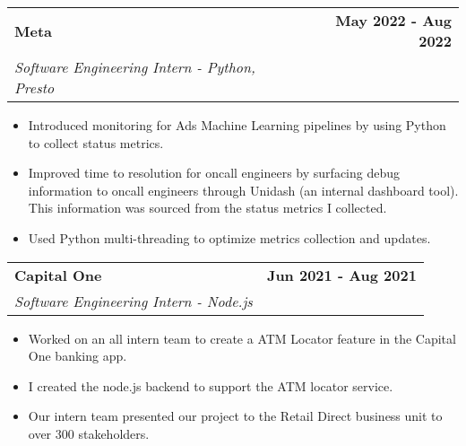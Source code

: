 \documentclass[10pt]{extreport}
\makeatletter
\newcommand{\resumeSubheading}[4]{
  \vspace{-1pt}
    \begin{tabular*}{1.0\textwidth}{l@{\extracolsep{\fill}}r}
      \textbf{#1} & \textbf{#2}  \vspace{1mm} \\
      {#3} & \textbf{#4} \\
    \end{tabular*}\vspace{-3pt}
}
\makeatother
\begin{document}
\resumeSubheading{Meta}{May 2022 - Aug 2022}
    {\textit{Software Engineering Intern - Python, Presto}}{}
    \vspace{-2mm}
    \begin{itemize}
     \item[\textperiodcentered] Introduced monitoring for Ads Machine Learning pipelines by using Python to collect status metrics.

     \vspace{-2mm}
     \item[\textperiodcentered] Improved time to resolution for oncall engineers by surfacing debug information to oncall engineers through Unidash (an internal dashboard tool). This information was sourced from the status metrics I collected.

     \vspace{-2mm}
     \item[\textperiodcentered] Used Python multi-threading to optimize metrics collection and updates.
    \end{itemize}
    
    \resumeSubheading{Capital One}{Jun 2021 - Aug 2021}
    {\textit{Software Engineering Intern - Node.js}}{}
    \vspace{-2mm}
    \begin{itemize}
    \item[\textperiodcentered] Worked on an all intern team to create a ATM Locator feature in the Capital One banking app.
            \vspace{-2mm}

        \item[\textperiodcentered] I created the node.js backend to support the ATM locator service.
                \vspace{-2mm}

        \item[\textperiodcentered] Our intern team presented our project to the Retail Direct business unit to over 300 stakeholders.
    \end{itemize}
    
\end{document}
